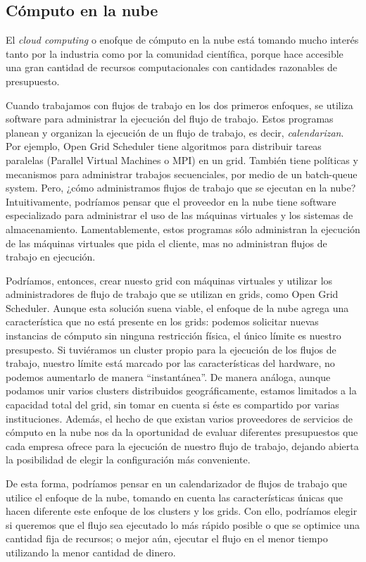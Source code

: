 \documentclass[letterpaper]{report}
\begin{document}
\subsection{Cómputo en la nube}

El \emph{cloud computing} o enofque de cómputo en la nube está tomando mucho interés tanto por la industria como por la comunidad científica, porque hace accesible una gran cantidad de recursos computacionales con cantidades razonables de presupuesto.

Cuando trabajamos con flujos de trabajo en los dos primeros enfoques, se utiliza software para administrar la ejecución del flujo de trabajo. Estos programas planean y organizan la ejecución de un flujo de trabajo, es decir, \emph{calendarizan}. Por ejemplo, Open Grid Scheduler tiene algoritmos para distribuir tareas paralelas (Parallel Virtual Machines o MPI) en un grid. También tiene políticas y mecanismos para administrar trabajos secuenciales, por medio de un batch-queue system. Pero, ¿cómo administramos flujos de trabajo que se ejecutan en la nube? Intuitivamente, podríamos pensar que el proveedor en la nube tiene software especializado para administrar el uso de las máquinas virtuales y los sistemas de almacenamiento. Lamentablemente, estos programas sólo administran la ejecución de las máquinas virtuales que pida el cliente, mas no administran flujos de trabajo en ejecución. 

Podríamos, entonces, crear nuesto grid con máquinas virtuales y utilizar los administradores de flujo de trabajo que se utilizan en grids, como Open Grid Scheduler. Aunque esta solución suena viable, el enfoque de la nube agrega una característica que no está presente en los grids: podemos solicitar nuevas instancias de cómputo sin ninguna restricción física, el único límite es nuestro presupesto. Si tuviéramos un cluster propio para la ejecución de los flujos de trabajo, nuestro límite está marcado por las características del hardware, no podemos aumentarlo de manera ``instantánea''. De manera análoga, aunque podamos unir varios clusters distribuidos geográficamente, estamos limitados a la capacidad total del grid, sin tomar en cuenta si éste es compartido por varias instituciones. Además, el hecho de que existan varios proveedores de servicios de cómputo en la nube nos da la oportunidad de evaluar diferentes presupuestos que cada empresa ofrece para la ejecución de nuestro flujo de trabajo, dejando abierta la posibilidad de elegir la configuración más conveniente.

De esta forma, podríamos pensar en un calendarizador de flujos de trabajo que utilice el enfoque de la nube, tomando en cuenta las características únicas que hacen diferente este enfoque de los clusters y los grids. Con ello, podríamos elegir si queremos que el flujo sea ejecutado lo más rápido posible o que se optimice una cantidad fija de recursos; o mejor aún, ejecutar el flujo en el menor tiempo utilizando la menor cantidad de dinero.
\end{document}
